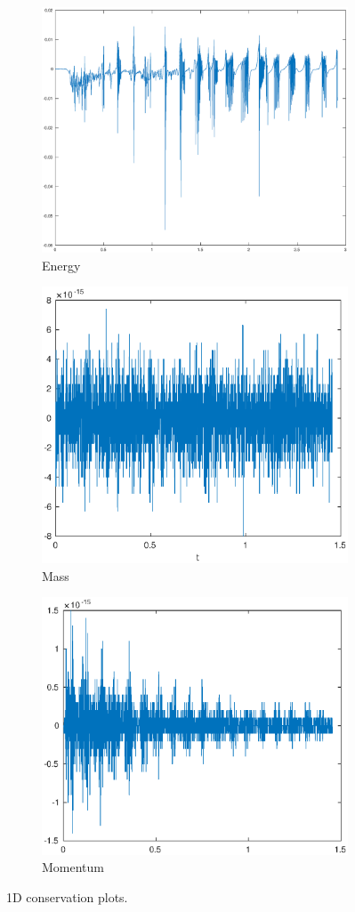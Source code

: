 \begin{figure}[h!]
    \centering
    \begin{subfigure}[b]{0.9\textwidth}
        \centering
        \includegraphics[width=1.1\textwidth,height=0.52\textwidth]{images/cons_energy1d.eps}\hfill
        \caption{Energy}
        \label{fig:Energy}
    \end{subfigure}
    \hfill
    \begin{subfigure}[b]{0.9\textwidth}
        \centering
        \includegraphics[width=1.1\textwidth, height=0.52\textwidth]{images/cons_mass1d.eps}\hfill
        \caption{Mass}
        \label{fig:Mass}
    \end{subfigure}
    \hfill
    \begin{subfigure}[b]{0.9\textwidth}
        \centering
        \includegraphics[width=1.1\textwidth,height=0.52\textwidth]{images/cons_momu1d.eps}\hfill
        \caption{Momentum}
        \label{Momentum}
    \end{subfigure}
    \caption{1D conservation plots.}
    \label{fig:1D_cons}
\end{figure}

